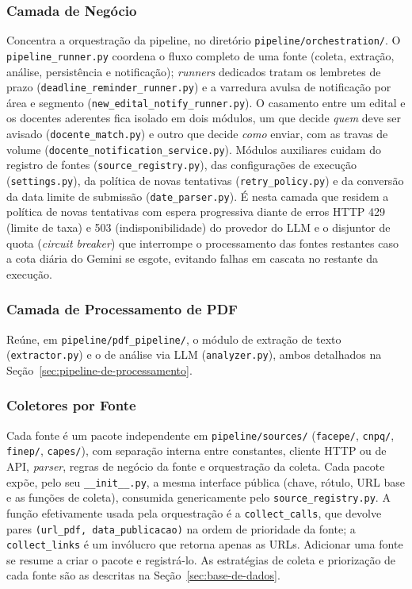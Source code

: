 \documentclass[12pt]{article}
\begin{document}
  \subsubsection{Camada de Negócio}
  Concentra a orquestração da pipeline, no diretório \texttt{pipeline/orchestration/}. O \texttt{pipeline\_runner.py} coordena o fluxo completo de uma fonte (coleta, extração, análise, persistência e notificação); \emph{runners} dedicados tratam os lembretes de prazo (\texttt{deadline\_reminder\_runner.py}) e a varredura avulsa de notificação por área e segmento (\texttt{new\_edital\_notify\_runner.py}). O casamento entre um edital e os docentes aderentes fica isolado em dois módulos, um que decide \emph{quem} deve ser avisado (\texttt{docente\_match.py}) e outro que decide \emph{como} enviar, com as travas de volume (\texttt{docente\_notification\_service.py}). Módulos auxiliares cuidam do registro de fontes (\texttt{source\_registry.py}), das configurações de execução (\texttt{settings.py}), da política de novas tentativas (\texttt{retry\_policy.py}) e da conversão da data limite de submissão (\texttt{date\_parser.py}). É nesta camada que residem a política de novas tentativas com espera progressiva diante de erros HTTP 429 (limite de taxa) e 503 (indisponibilidade) do provedor do LLM e o disjuntor de quota (\emph{circuit breaker}) que interrompe o processamento das fontes restantes caso a cota diária do Gemini se esgote, evitando falhas em cascata no restante da execução.

  \subsubsection{Camada de Processamento de PDF}
  Reúne, em \texttt{pipeline/pdf\_pipeline/}, o módulo de extração de texto (\texttt{extractor.py}) e o de análise via LLM (\texttt{analyzer.py}), ambos detalhados na Seção~\ref{sec:pipeline-de-processamento}.

  \subsubsection{Coletores por Fonte}
  Cada fonte é um pacote independente em \texttt{pipeline/sources/} (\texttt{facepe/}, \texttt{cnpq/}, \texttt{finep/}, \texttt{capes/}), com separação interna entre constantes, cliente HTTP ou de API, \emph{parser}, regras de negócio da fonte e orquestração da coleta. Cada pacote expõe, pelo seu \texttt{\_\_init\_\_.py}, a mesma interface pública (chave, rótulo, URL base e as funções de coleta), consumida genericamente pelo \texttt{source\_registry.py}. A função efetivamente usada pela orquestração é a \texttt{collect\_calls}, que devolve pares \texttt{(url\_pdf, data\_publicacao)} na ordem de prioridade da fonte; a \texttt{collect\_links} é um invólucro que retorna apenas as URLs. Adicionar uma fonte se resume a criar o pacote e registrá-lo. As estratégias de coleta e priorização de cada fonte são as descritas na Seção~\ref{sec:base-de-dados}.
\end{document}

